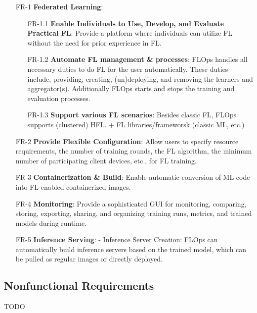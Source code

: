 \begin{itemize}
    \item [FR-1] {\textbf{Federated Learning}}:
        \begin{itemize}
        \item [FR-1.1] \textbf{Enable Individuals to Use, Develop, and Evaluate Practical FL}:
            Provide a platform where individuals can utilize FL without the need for prior experience in FL.
        \item [FR-1.2] \textbf{Automate FL management \& processes}:
            FLOps handles all necessary duties to do FL for the user automatically.
            These duties include, providing, creating, (un)deploying, and removing the learners and aggregator(s).
            Additionally FLOps starts and stops the training and evaluation processes.
        \item [FR-1.3] \textbf{Support various FL scenarios}:
            Besides classic FL, FLOps supports (clustered) HFL. + FL libraries/frameworsk (classic ML, etc.)    
        \end{itemize}
    \item [FR-2] {\textbf{Provide Flexible Configuration}}:
        Allow users to specify resource requirements, the number of training rounds, the FL algorithm, the minimum number of participating client devices, etc., for FL training.
    \item [FR-3] {\textbf{Containerization \& Build}}:
        Enable automatic conversion of ML code into FL-enabled containerized images.
    \item [FR-4] {\textbf{Monitoring}}:
        Provide a sophisticated GUI for monitoring, comparing, storing, exporting, sharing, and organizing training runs, metrics, and trained models during runtime.
    \item [FR-5] {\textbf{Inference Serving}}: - Inference Server Creation:
        FLOps can automatically build inference servers based on the trained model, which can be pulled as regular images or directly deployed.
\end{itemize}

\subsection{Nonfunctional Requirements}
TODO

